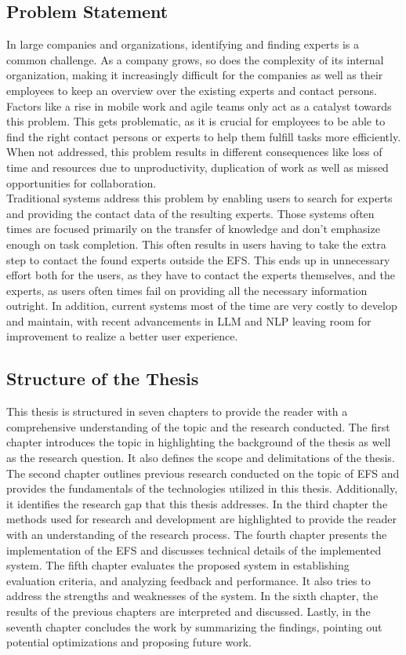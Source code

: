 \subsection{Problem Statement}
In large companies and organizations, identifying and finding experts is a common challenge. As a company grows, so does the complexity of its internal organization, making it increasingly difficult for the companies as well as their employees to keep an overview over the existing experts and contact persons. Factors like a rise in mobile work and agile teams only act as a catalyst towards this problem. This gets problematic, as it is crucial for employees to be able to find the right contact persons or experts to help them fulfill tasks more efficiently. When not addressed, this problem results in different consequences like loss of time and resources due to unproductivity, duplication of work as well as missed opportunities for collaboration. \\
Traditional systems address this problem by enabling users to search for experts and providing the contact data of the resulting experts. Those systems often times are focused primarily on the transfer of knowledge and don't emphasize enough on task completion. This often results in users having to take the extra step to contact the found experts outside the \ac{EFS}. This ends up in unnecessary effort both for the users, as they have to contact the experts themselves, and the experts, as users often times fail on providing all the necessary information outright. In addition, current systems most of the time are very costly to develop and maintain, with recent advancements in \ac{LLM} and \ac{NLP} leaving room for improvement to realize a better user experience.

\subsection{Structure of the Thesis}
This thesis is structured in seven chapters to provide the reader with a comprehensive understanding of the topic and the research conducted. The first chapter introduces the topic in highlighting the background of the thesis as well as the research question. It also defines the scope and delimitations of the thesis. The second chapter outlines previous research conducted on the topic of \ac{EFS} and provides the fundamentals of the technologies utilized in this thesis. Additionally, it identifies the research gap that this thesis addresses. In the third chapter the methods used for research and development are highlighted to provide the reader with an understanding of the research process. The fourth chapter presents the implementation of the \ac{EFS} and discusses technical details of the implemented system. The fifth chapter evaluates the proposed system in establishing evaluation criteria, and analyzing feedback and performance. It also tries to address the strengths and weaknesses of the system. In the sixth chapter, the results of the previous chapters are interpreted and discussed. Lastly, in the seventh chapter concludes the work by summarizing the findings, pointing out potential optimizations and proposing future work.

